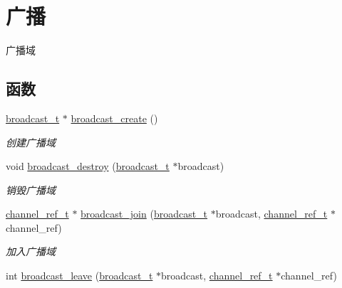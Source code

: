 \hypertarget{a00100}{}\section{广播}
\label{a00100}


广播域  


\subsection*{函数}
\begin{DoxyCompactItemize}
\item 
\hyperlink{a00050_ac970c5deaf6417a866aabed01cd57b1b_ac970c5deaf6417a866aabed01cd57b1b}{broadcast\+\_\+t} $\ast$ \hyperlink{a00100_gaa3b09fb6ff3281cb10736c0aabac18fc_gaa3b09fb6ff3281cb10736c0aabac18fc}{broadcast\+\_\+create} ()
\begin{DoxyCompactList}\small\item\em 创建广播域 \end{DoxyCompactList}\item 
void \hyperlink{a00100_gaa28451fa4656633ded0c7b966ff159c3_gaa28451fa4656633ded0c7b966ff159c3}{broadcast\+\_\+destroy} (\hyperlink{a00050_ac970c5deaf6417a866aabed01cd57b1b_ac970c5deaf6417a866aabed01cd57b1b}{broadcast\+\_\+t} $\ast$broadcast)
\begin{DoxyCompactList}\small\item\em 销毁广播域 \end{DoxyCompactList}\item 
\hyperlink{a00050_a151271c9d188ef28d4d24bb81dcc1263_a151271c9d188ef28d4d24bb81dcc1263}{channel\+\_\+ref\+\_\+t} $\ast$ \hyperlink{a00100_ga1c736809a1d0e4b7c77b617ac8ce590d_ga1c736809a1d0e4b7c77b617ac8ce590d}{broadcast\+\_\+join} (\hyperlink{a00050_ac970c5deaf6417a866aabed01cd57b1b_ac970c5deaf6417a866aabed01cd57b1b}{broadcast\+\_\+t} $\ast$broadcast, \hyperlink{a00050_a151271c9d188ef28d4d24bb81dcc1263_a151271c9d188ef28d4d24bb81dcc1263}{channel\+\_\+ref\+\_\+t} $\ast$channel\+\_\+ref)
\begin{DoxyCompactList}\small\item\em 加入广播域 \end{DoxyCompactList}\item 
int \hyperlink{a00100_gad846ced37d33b750f61a88565eaed9a4_gad846ced37d33b750f61a88565eaed9a4}{broadcast\+\_\+leave} (\hyperlink{a00050_ac970c5deaf6417a866aabed01cd57b1b_ac970c5deaf6417a866aabed01cd57b1b}{broadcast\+\_\+t} $\ast$broadcast, \hyperlink{a00050_a151271c9d188ef28d4d24bb81dcc1263_a151271c9d188ef28d4d24bb81dcc1263}{channel\+\_\+ref\+\_\+t} $\ast$channel\+\_\+ref)

\end{DoxyCompactItemize}
